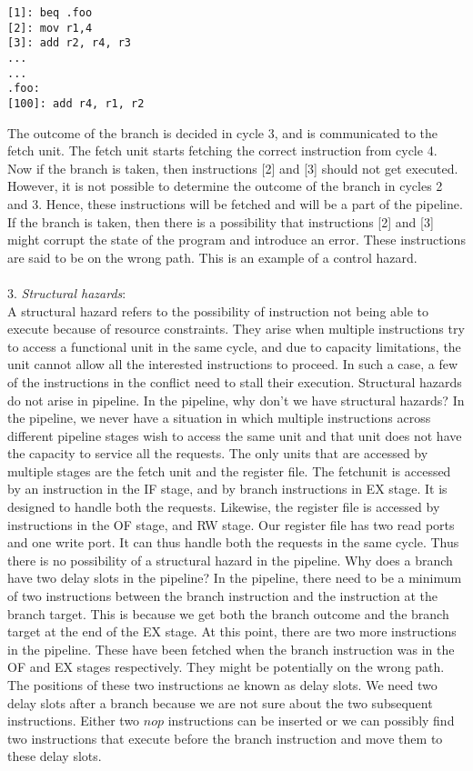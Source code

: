 \begin{ExerciseList}
\begin{Verbatim}
[1]: beq .foo 
[2]: mov r1,4 
[3]: add r2, r4, r3 
... 
... 
.foo:
[100]: add r4, r1, r2 
\end{Verbatim}
The outcome of the branch is decided in cycle 3, and is communicated to the fetch unit. The fetch unit starts fetching the correct instruction from cycle 4. Now if the branch is taken, then instructions [2] and [3] should not get executed. However, it is not possible to determine the outcome of the branch in cycles 2 and 3. Hence, these instructions will be fetched and will be a part of the pipeline. If the branch is taken, then there is a possibility that instructions [2] and [3] might corrupt the state of the program and introduce an error. These instructions are said to be on the wrong path. This is an example of a control hazard. \\ \\
3. \textit{Structural hazards}: \\
A structural hazard refers to the possibility of instruction not being able to execute because of resource constraints. They arise when multiple instructions try to access a functional unit in the same cycle, and due to capacity limitations, the unit cannot allow all the interested instructions to proceed. In such a case, a few of the instructions in the conflict need to stall their execution. Structural hazards do not arise in \simplerisc pipeline.
\Exercise
In the \simplerisc pipeline, why don't we have structural hazards?
\Answer
In the \simplerisc pipeline, we never have a situation in which multiple instructions across different pipeline stages wish to access the same unit and that unit does not have the capacity to service all the requests. The only units that are accessed by multiple stages are the fetch unit and the register file. The fetchunit is accessed by an instruction in the IF stage, and by branch instructions in EX stage. It is designed to handle both the requests. Likewise, the register file is accessed by instructions in the OF stage, and RW stage. Our register file has two read ports and one write port. It can thus handle both the requests in the same cycle. Thus there is no possibility of a structural hazard in the \simplerisc pipeline. 
\Exercise
Why does a branch have two delay slots in the \simplerisc pipeline?
\Answer
In the \simplerisc pipeline, there need to be a minimum of two instructions between the branch instruction and the instruction at the branch target. This is because we get both the branch outcome and the branch target at the end of the EX stage. At this point, there are two more instructions in the pipeline. These have been fetched when the branch instruction was in the OF and EX stages respectively. They might be potentially on the wrong path. The positions of these two instructions ae known as delay slots. We need two delay slots after a branch because we are not sure about the two subsequent instructions. Either two $nop$ instructions can be inserted or we can possibly find two instructions that execute before the branch instruction and move them to these delay slots. 

\end{ExerciseList}
